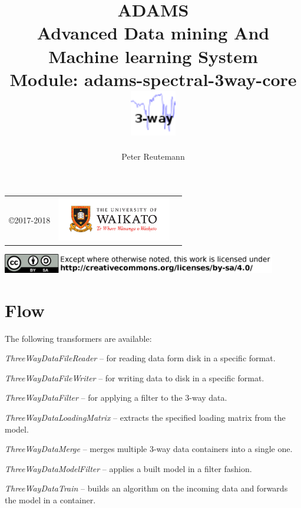 \documentclass[a4paper]{book}
\title{
  \textbf{ADAMS} \\
  {\Large \textbf{A}dvanced \textbf{D}ata mining \textbf{A}nd \textbf{M}achine
  learning \textbf{S}ystem} \\
  {\Large Module: adams-spectral-3way-core} \\
  \vspace{1cm}
  \includegraphics[width=2cm]{images/spectral-3way-core-module.png} \\
}
\author{
  Peter Reutemann
}
\begin{document}
\begin{titlepage}
\maketitle

\thispagestyle{empty}
\center
\begin{table}[b]
	\begin{tabular}{c l l}
		\parbox[c][2cm]{2cm}{\copyright 2017-2018} &
		\parbox[c][2cm]{5cm}{\includegraphics[width=5cm]{images/coat_of_arms.pdf}} \\
	\end{tabular}
	\includegraphics[width=12cm]{images/cc.png} \\
\end{table}

\end{titlepage}

\tableofcontents

\chapter{Flow}
The following transformers are available:
\begin{tight_itemize}
  \item \textit{ThreeWayDataFileReader} -- for reading data form disk in a
  specific format.
  \item \textit{ThreeWayDataFileWriter} -- for writing data to disk in a
  specific format.
  \item \textit{ThreeWayDataFilter} -- for applying a filter to the 3-way data.
  \item \textit{ThreeWayDataLoadingMatrix} -- extracts the specified loading matrix
  from the model.
  \item \textit{ThreeWayDataMerge} -- merges multiple 3-way data containers into a single one.
  \item \textit{ThreeWayDataModelFilter} -- applies a built model in a filter fashion.
  \item \textit{ThreeWayDataTrain} -- builds an algorithm on the incoming data
  and forwards the model in a container.
\end{tight_itemize}
\end{document}
